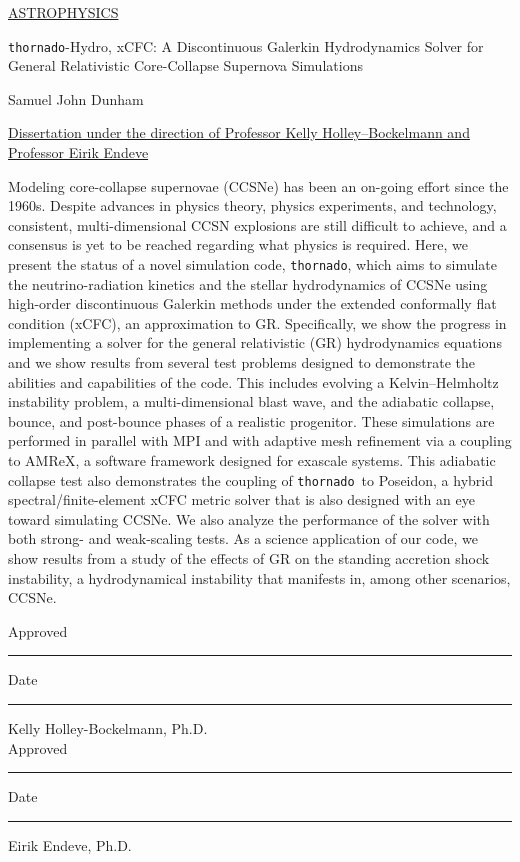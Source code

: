 \documentclass[10pt]{article}
\newcommand{\thornado}{\texttt{thornado}}
\begin{document}

\begin{flushright}
\underline{ASTROPHYSICS}
\end{flushright}\vspace{1em}

\flushleft

\begin{center}
\thornado-Hydro, xCFC: A Discontinuous Galerkin Hydrodynamics
Solver for General Relativistic
Core-Collapse Supernova Simulations
\end{center}\vspace{1em}

\begin{center}
Samuel John Dunham
\end{center}\vspace{1em}

\centerline{\underline{Dissertation under the direction of
Professor Kelly Holley--Bockelmann and Professor Eirik Endeve}}
\vspace{1em}

\begin{doublespace}

Modeling core-collapse supernovae (CCSNe) has been an on-going effort
since the 1960s.
Despite advances in physics theory, physics experiments, and technology,
consistent, multi-dimensional CCSN explosions are still difficult to achieve,
and a consensus is yet to be reached regarding what physics is required.
Here, we present the status of a novel simulation code, \thornado,
which aims to simulate the neutrino-radiation kinetics
and the stellar hydrodynamics of
CCSNe using high-order discontinuous Galerkin methods
under the extended conformally flat condition (xCFC), an approximation to GR.
Specifically, we show the progress in implementing a
solver for the general relativistic (GR)
hydrodynamics equations and we show results from several test problems
designed to demonstrate the abilities and capabilities of the code.
This includes evolving a Kelvin--Helmholtz instability problem,
a multi-dimensional blast wave, and
the adiabatic collapse, bounce, and post-bounce phases
of a realistic progenitor.
These simulations are performed
in parallel with MPI and with adaptive mesh refinement via a coupling
to AMReX, a software framework designed for exascale systems.
This adiabatic collapse test also demonstrates the coupling of \thornado\ to
Poseidon, a hybrid spectral/finite-element xCFC metric solver
that is also designed
with an eye toward simulating CCSNe.
We also analyze the performance of the solver with both
strong- and weak-scaling tests.
As a science application of our code,
we show results from a study of the effects of GR on the
standing accretion shock instability, a hydrodynamical instability
that manifests in, among other scenarios, CCSNe.

\end{doublespace}
\vspace{3em}

\noindent Approved \rule[-3pt]{3.5in}{.5pt} \hskip 0.1in %
          Date     \rule[-3pt]{1.5in}{.5pt}
\hspace*{1.3in} Kelly Holley-Bockelmann, Ph.D. \\[0.1in]
\noindent Approved \rule[-3pt]{3.5in}{.5pt} \hskip 0.1in %
          Date     \rule[-3pt]{1.5in}{.5pt}
\hspace*{1.3in} Eirik Endeve, Ph.D.
\end{document}
